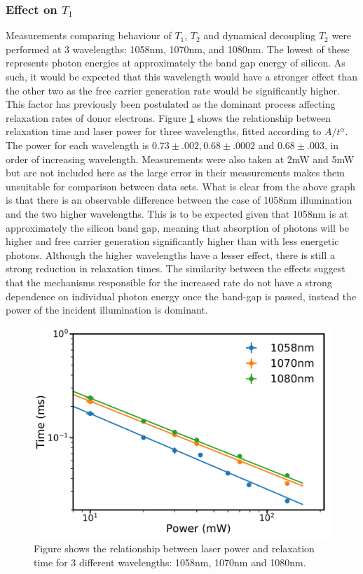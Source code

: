 \subsubsection{Effect on $T_1$}

Measurements comparing behaviour of $T_1$, $T_2$ and dynamical decoupling $T_2$ were performed at 3 wavelengths: 1058nm, 1070nm, and 1080nm.
The lowest of these represents photon energies at approximately the band gap energy of silicon. 
As such, it would be expected that this wavelength would have a stronger effect than the other two as the free carrier generation rate would be significantly higher.
This factor has previously been postulated as the dominant process affecting relaxation rates of donor electrons.
Figure \ref{fig:wavcomparison} shows the relationship between relaxation time and laser power for three wavelengths, fitted according to $A/t^{\alpha}$. 
The power for each wavelength is $0.73\pm.002, 0.68\pm.0002$ and $0.68\pm.003$, in order of increasing wavelength.
Measurements were also taken at 2mW and 5mW but are not included here as the large error in their measurements makes them unsuitable for comparison between data sets. 
What is clear from the above graph is that there is an observable difference between the case of 1058nm illumination and the two higher wavelengths. 
This is to be expected given that 1058nm is at approximately the silicon band gap, meaning that absorption of photons will be higher and free carrier generation significantly higher than with less energetic photons.
Although the higher wavelengths have a lesser effect, there is still a strong reduction in relaxation times.
The similarity between the effects suggest that the mechanisms responsible for the increased rate do not have a strong dependence on individual photon energy once the band-gap is passed, instead the power of the incident illumination is dominant. 

\begin{figure}
\centering
\includegraphics[width = 0.8\columnwidth]{Figures/Logwavelengthcomp.pdf}
\caption[Relaxation comparison at 8k and 1058nm, 1070nm, and 1080nm illumination]{Figure shows the relationship between laser power and relaxation time for 3 different wavelengths: 1058nm, 1070nm and 1080nm.}
\label{fig:wavcomparison}
\end{figure}

